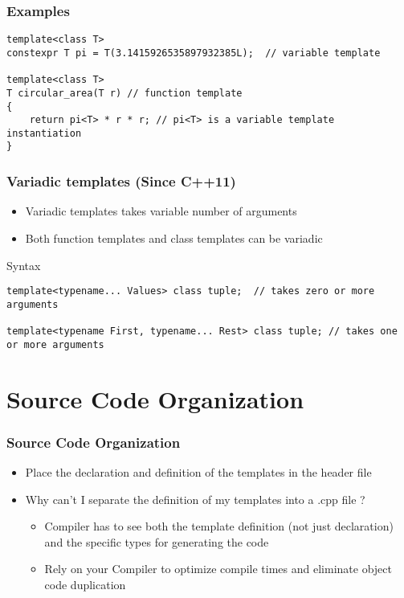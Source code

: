 \documentclass{beamer}
\begin{document}
\begin{frame}[fragile]
\frametitle{Examples}
\begin{lstlisting}
template<class T>
constexpr T pi = T(3.1415926535897932385L);  // variable template
 
template<class T>
T circular_area(T r) // function template
{
    return pi<T> * r * r; // pi<T> is a variable template instantiation
}
\end{lstlisting}
\end{frame}


\begin{frame}[fragile]
\frametitle{Variadic templates (Since C++11)}
\begin{itemize}
\item Variadic templates takes variable number of arguments
\item Both function templates and class templates can be variadic
\end{itemize}
\begin{block} {Syntax}
\begin{lstlisting}
template<typename... Values> class tuple;  // takes zero or more arguments

template<typename First, typename... Rest> class tuple; // takes one or more arguments
\end{lstlisting}
\end{block}

\end{frame}

\section{Source Code Organization}
\begin{frame}[fragile]
\frametitle{Source Code Organization}

\begin{itemize}
\item Place the declaration and definition of the templates in the header file
\item Why can’t I separate the definition of my templates into a .cpp file ?
    \begin{itemize}
    \item Compiler has to see both the template definition (not just declaration) and the specific types for generating the code
    \item Rely on your Compiler to optimize compile times and eliminate object code duplication
    \end{itemize}
\end{itemize}

\end{frame}
\end{document}
